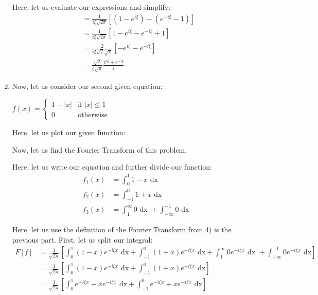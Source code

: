 \begin{enumerate}
Here, let us evaluate our expressions and simplify:
%
\begin{align}
  & =
  \frac{1}{i \xi \sqrt{2 \pi}}
  \left[
  \left(
  1 - e^{i \xi}
  \right)
  -
  \left(
  e^{-i \xi} - 1
  \right)
  \right]\\
  & =
  \frac{1}{i \xi \sqrt{2 \pi}}
  \left[
  1 - e^{i \xi}
  - e^{-i \xi} + 1
  \right]\\
  & =
  \frac{2}{i \xi \sqrt{2} \sqrt{\pi}}
  \left[
  - e^{i \xi} - e^{-i \xi}
  \right]\\
  & =
  \frac{\sqrt 2}{\xi \sqrt \pi}
  \frac{e^{i \xi} + e^{-i \xi}}{i}
\end{align}


\setcounter{equation}{0}
\item Now, let us consider our second given equation:

$\displaystyle
f(x) =
\begin{cases}
  1 - |x| & \text{if } |x| \leq 1\\
  0 & \text{otherwise}
\end{cases}
$

Here, let us plot our given function:

\begin{center}
\end{center}

Now, let us find the Fourier Transform of this problem.

Here, let us write our equation and further divide our function:
%
\begin{align}
  f_1(x) & = \int^1_0 1 - x \text{ dx}\\
  f_2(x) & = \int^0_{-1} 1 + x \text{ dx}\\
  f_3(x) & = \int^\infty_1 0 \text{ dx } + \int^{-1}_{-\infty} 0 \text{ dx}
\end{align}

Here, let us use the definition of the Fourier Transform from 4) is the previous part. First, let us split our integral:
%
\begin{align}
  F[f]
  & = \frac{1}{\sqrt{2 \pi}}
  \left[
    \int^1_0            (1 - x) e^{-i \xi x} \text{ dx}
  + \int^0_{-1}         (1 + x) e^{-i \xi x} \text{ dx}
  + \int^\infty_1       0     e^{-i \xi x} \text{ dx }
  + \int^{-1}_{-\infty} 0     e^{-i \xi x} \text{ dx}
  \right]\\
  & =
  \frac{1}{\sqrt{2 \pi}}
  \left[
    \int^1_0    (1 - x) e^{-i \xi x} \text{ dx}
  + \int^0_{-1} (1 + x) e^{-i \xi x} \text{ dx}
  \right]\\
  & =
  \frac{1}{\sqrt{2 \pi}}
  \left[
    \int^1_0    e^{-i \xi x} - x e^{-i \xi x} \text{ dx}
  + \int^0_{-1} e^{-i \xi x} + x e^{-i \xi x} \text{ dx}
  \right]
\end{align}


\end{enumerate}
